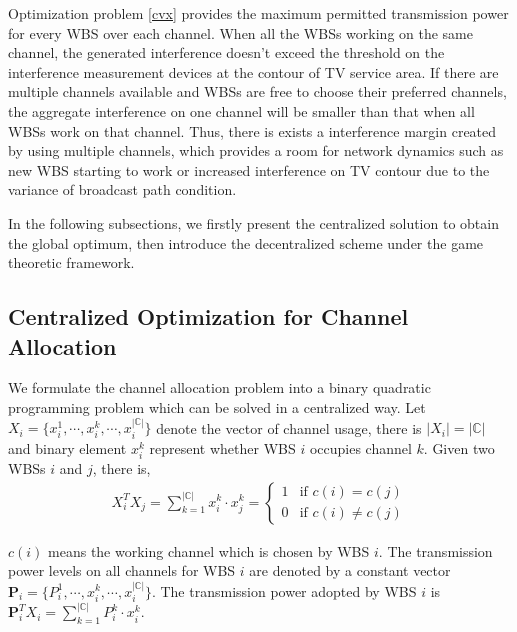 \documentclass[times]{ettauth}
\theoremstyle{mytheoremstyle}
\theoremstyle{mytheoremstyle}
\theoremstyle{mytheoremstyle}
\renewcommand{\vec}[1]{\mathbf{#1}}
\begin{document}
Optimization problem \ref{cvx} provides the maximum permitted transmission power for every WBS over each channel.
When all the WBSs working on the same channel, the generated interference doesn't exceed the threshold on the interference measurement devices at the contour of TV service area. 
If there are multiple channels available and WBSs are free to choose their preferred channels, the aggregate interference on one channel will be smaller than that when all WBSs work on that channel. 
Thus, there is exists a interference margin created by using multiple channels, which provides a room for network dynamics such as new WBS starting to work or increased interference on TV contour due to the variance of broadcast path condition. 


In the following subsections, we firstly present the centralized solution to obtain the global optimum, then introduce the decentralized scheme under the game theoretic framework.


\subsection{Centralized Optimization for Channel Allocation}
\label{03_centralized_ca}

We formulate the channel allocation problem into a binary quadratic programming problem which can be solved in a centralized way.  
Let $X_i = \{x_i^1,\cdots, x_i^k,\cdots, x_i^{|\mathbb{C}|}\}$ denote the vector of channel usage, there is $|X_i| = |\mathbb{C}|$ and binary element $x_i^k$ represent whether WBS $i$ occupies channel $k$.
Given two WBSs $i$ and $j$, there is,
\begin{equation}
\begin{split}
X_i^TX_j = \sum\limits_{k=1}^{|\mathbb{C}|}x_i^k\cdot x_j^k = 
\left\{ \begin{array}{ll}
1 & \mbox{if $c(i)=c(j)$} \\
0 & \mbox{if $c(i)\neq c(j)$} 
\end{array}
\right.
\end{split}
\end{equation}

$c(i)$ means the working channel which is chosen by WBS $i$.
The transmission power levels on all channels for WBS $i$ are denoted by a constant vector $\vec{P}_i = \{P_i^1,\cdots, x_i^k,\cdots, x_i^{|\mathbb{C}|}\}$. 
The transmission power adopted by WBS $i$ is $\vec{P}_i^TX_i = \sum\limits_{k=1}^{|\mathbb{C}|}P_{i}^k\cdot x_i^k$.
\end{document}
